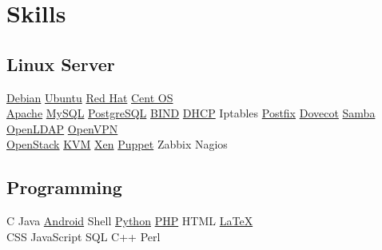 \documentclass[]{deedy-resume-openfont}
\begin{document}
\begin{minipage}[t]{0.33\textwidth}

\section{Skills}
\subsection{Linux Server}
\href{http://www.debian.org/}{Debian} \textbullet{}
\href{http://www.ubuntu.com/}{Ubuntu} \textbullet{}
\href{http://www.redhat.com/}{Red Hat} \textbullet{}
\href{http://www.centos.org/}{Cent OS} \\
\href{http://httpd.apache.org/}{Apache} \textbullet{}
\href{https://www.mysql.com/}{MySQL} \textbullet{}
\href{http://www.postgresql.org/}{PostgreSQL} \textbullet{}
\href{https://www.isc.org/downloads/bind/}{BIND} \textbullet{}
\href{https://www.isc.org/downloads/dhcp/}{DHCP} \textbullet{}
Iptables \textbullet{}
\href{http://www.postfix.org/}{Postfix} \textbullet{}
\href{http://www.dovecot.org/}{Dovecot} \textbullet{}
\href{https://www.samba.org/}{Samba} \textbullet{}
\href{http://www.openldap.org/}{OpenLDAP} \textbullet{}
\href{https://openvpn.net/}{OpenVPN} \\
\href{http://openstack.org/}{OpenStack} \textbullet{}
\href{http://www.linux-kvm.org/}{KVM} \textbullet{}
\href{http://xenproject.org/}{Xen} \textbullet{}
\href{http://puppetlabs.com/}{Puppet} \textbullet{}
Zabbix \textbullet{}
Nagios \textbullet{}
\sectionsep

\subsection{Programming}
C \textbullet{}
Java \textbullet{}
\href{http://android.com}{Android} \textbullet{}
Shell \textbullet{}
\href{http://www.python.org}{Python} \textbullet{}
\href{http://www.php.net}{PHP} \textbullet{}
HTML \textbullet{}
\href{http://www.latex-project.org}{\LaTeX}\\
CSS \textbullet{}
JavaScript \textbullet{}
SQL \textbullet{}
C++ \textbullet{}
Perl
\sectionsep


\end{minipage}
\end{document}

